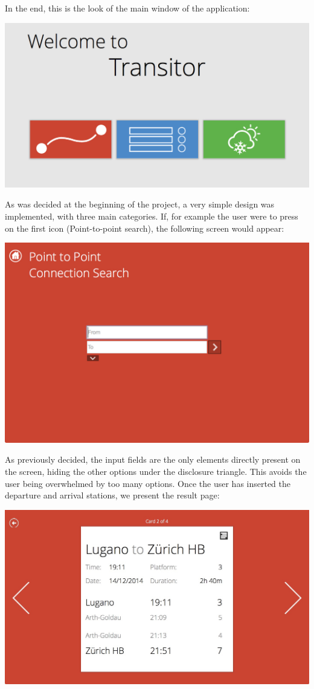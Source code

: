 \documentclass[a4paper]{article}
\begin{document}
In the end, this is the look of the main window of the application:
\begin{center}
\includegraphics[scale=0.25]{transitorScreens/mainPage.jpeg}
\end{center}
As was decided at the beginning of the project, a very simple design was implemented, with three main categories. If, for example the user were to press on the first icon (Point-to-point search), the following screen would appear:
\begin{center}
\includegraphics[scale=0.3]{transitorScreens/p2p.jpeg}
\end{center}
As previously decided, the input fields are the only elements directly present on the screen, hiding the other options under the disclosure triangle. This avoids the user being overwhelmed by too many options. Once the user has inserted the departure and arrival stations, we present the result page:
\begin{center}
\includegraphics[scale=0.22]{transitorScreens/p2pReq.jpeg}
\end{center}
\end{document}
